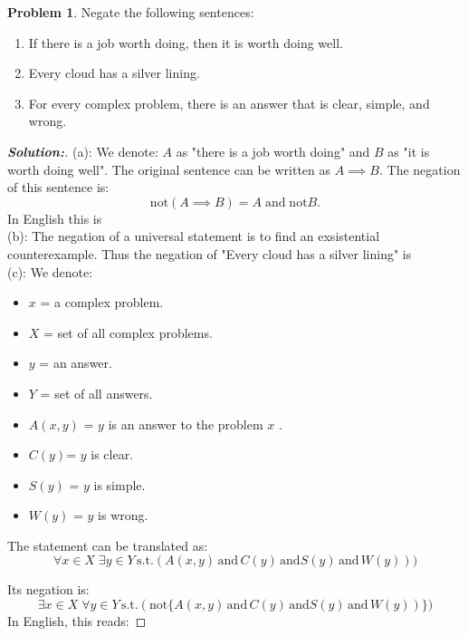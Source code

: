 \documentclass[12pt]{article}
\theoremstyle{definition}\newtheorem{problem}{Problem}
\newenvironment{solution}{\begin{proof}[\bfseries\textup{Solution:}]}{\end{proof}}
\begin{document}
%
\newpage
\begin{problem}
Negate the following sentences:
\begin{enumerate}
\item If there is a job worth doing, then it is worth doing well.
\item Every cloud has a silver lining.
\item For every complex problem, there is an answer that is clear, simple, and wrong.
\end{enumerate}
\end{problem}
\begin{solution}\quad \newline

    (a): We denote: $ A $ as "there is a job worth doing" and $ B $ as "it is worth doing well". The original sentence can be written as $ A \implies B $. The negation of this sentence is: $$ \text{not} (A \implies B) = A \; \text{and} \; \text{not}B.  $$ 
    In English this is 
\\

    (b): The negation of a universal statement is to find an exsistential counterexample. Thus the negation of "Every cloud has a silver lining" is \\

    (c): We denote: \begin{itemize}
        \item  $x$ = a complex problem.
        \item $ X $ = set of all complex problems.
        \item $y$ = an answer.
        \item $ Y $ = set of all answers.
        \item $A(x,y)$ = $y$ is an answer to the problem $ x $ .
        \item $ C(y) $= $ y $ is clear. 
        \item $S(y)$ = $y$ is simple.
        \item $W(y)$ = $y$ is wrong.
    \end{itemize}
    
The statement can be translated as: 
    $$\forall x \in X  \; \exists y \in Y \, \text{s.t.} (A(x,y) \, \text{and} \, C(y) \, \text{and} S(y) \, \text{and} \, W(y)))$$

Its negation is:
$$ 
\exists x \in X \; \forall y \in Y \, \text{s.t.}  (\text{not}\{A(x,y) \, \text{and} \, C(y) \, \text{and} S(y) \, \text{and} \, W(y))\})
$$ 
 In English, this reads: 
 


\end{solution}
\end{document}
